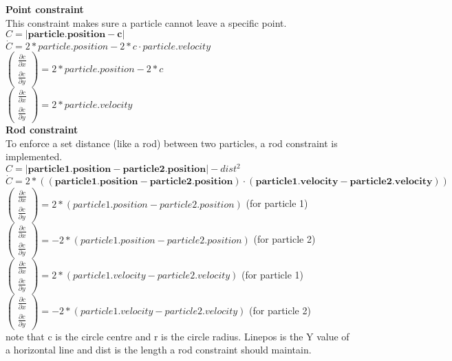 \pagebreak
\textbf{Point constraint} \\
This constraint makes sure a particle cannot leave a specific point.\\
$C = |\boldsymbol{particle.position} - \boldsymbol{c}|$ \\
$\dot{C} =2 * particle.position - 2 * c \cdot particle.velocity$ \\
$\begin{pmatrix} \frac{\partial c}{\partial x} \\ \frac{\partial c}{\partial y}  \end{pmatrix} = 2*particle.position - 2*c$ \\
$\begin{pmatrix} \frac{\partial\dot{c}}{\partial x} \\ \frac{\partial \dot{c}}{\partial y}  \end{pmatrix}= 2*particle.velocity$\\

\smallskip
\textbf{Rod constraint} \\
To enforce a set distance (like a rod) between two particles, a rod constraint is implemented. \\
$C = |\boldsymbol{particle1.position} - \boldsymbol{particle2.position}| - dist^2$ \\
$\dot{C} = 2*((\boldsymbol{particle1.position} - \boldsymbol{particle2.position}) \cdot (\boldsymbol{particle1.velocity} - \boldsymbol{particle2.velocity})	) $ \\
$\begin{pmatrix} \frac{\partial c}{\partial x} \\ \frac{\partial c}{\partial y}  \end{pmatrix} = 2*(particle1.position - particle2.position)$ (for particle 1) \\
$\begin{pmatrix} \frac{\partial c}{\partial x} \\ \frac{\partial c}{\partial y}  \end{pmatrix} = -2*(particle1.position - particle2.position)$ (for particle 2) \\
$\begin{pmatrix} \frac{\partial\dot{c}}{\partial x} \\ \frac{\partial \dot{c}}{\partial y}  \end{pmatrix}= 2*(particle1.velocity - particle2.velocity)$ (for particle 1)\\
$\begin{pmatrix} \frac{\partial\dot{c}}{\partial x} \\ \frac{\partial \dot{c}}{\partial y}  \end{pmatrix} = -2*(particle1.velocity - particle2.velocity)$ (for particle 2)\\

\smallskip
note that c is the circle centre and r is the circle radius. Linepos is the Y value of a horizontal line and dist is the length a rod constraint should maintain.

